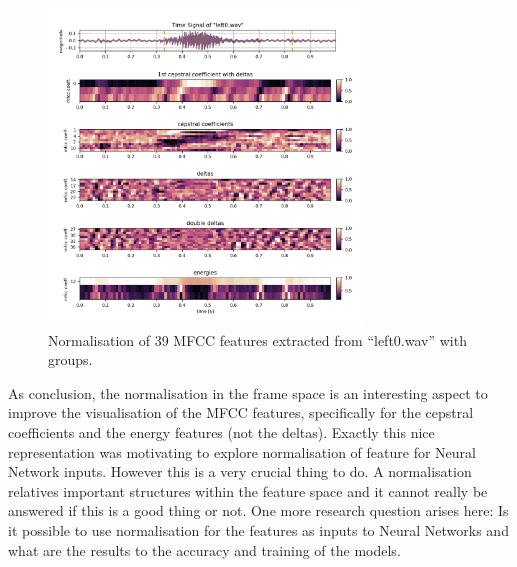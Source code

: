 \begin{figure}[!ht]
  \centering
    \includegraphics[width=0.75\textwidth]{./3_signal/figs/signal_mfcc_left0_order_norm1.png}
  \caption{Normalisation of 39 MFCC features extracted from \enquote{left0.wav} with groups.}
  \label{fig:left0_order_norm1}
\end{figure}
\FloatBarrier
\noindent
As conclusion, the normalisation in the frame space is an interesting aspect to improve the visualisation of the MFCC features, 
specifically for the cepstral coefficients and the energy features (not the deltas).
Exactly this nice representation was motivating to explore normalisation of feature for Neural Network inputs.
However this is a very crucial thing to do. A normalisation relatives important structures within the feature space and it cannot really be answered if this is a good thing or not.
One more research question arises here: Is it possible to use normalisation for the features as inputs to Neural Networks and what are the results to the accuracy and training of the models.
